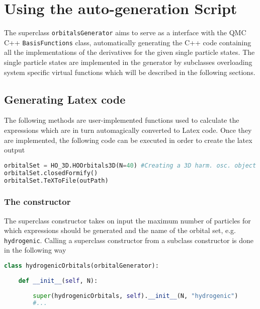 \section{Using the auto-generation Script}

The superclass \verb+orbitalsGenerator+ aims to serve as a interface with the QMC C++ \verb+BasisFunctions+ class, automatically generating the C++ code containing all the implementations of the derivatives for the given single particle states. The single particle states are implemented in the generator by subclasses overloading system specific virtual functions which will be described in the following sections.

\subsection{Generating Latex code}

The following methods are user-implemented functions used to calculate the expressions which are in turn automagically converted to Latex code. Once they are implemented, the following code can be executed in order to create the latex output

\vspace{0.25cm}
\begin{lstlisting}[language=Python]
orbitalSet = HO_3D.HOOrbitals3D(N=40) #Creating a 3D harm. osc. object
orbitalSet.closedFormify() 
orbitalSet.TeXToFile(outPath)
\end{lstlisting}

\subsubsection{The constructor}

The superclass constructor takes on input the maximum number of particles for which expressions should be generated and the name of the orbital set, e.g. \verb+hydrogenic+.
Calling a superclass constructor from a subclass constructor is done in the following way

\vspace{0.25cm}
\begin{lstlisting}[language=Python, otherkeywords={self}]
class hydrogenicOrbitals(orbitalGenerator):
 
    def __init__(self, N):
      
        super(hydrogenicOrbitals, self).__init__(N, "hydrogenic")
        #...
\end{lstlisting}



